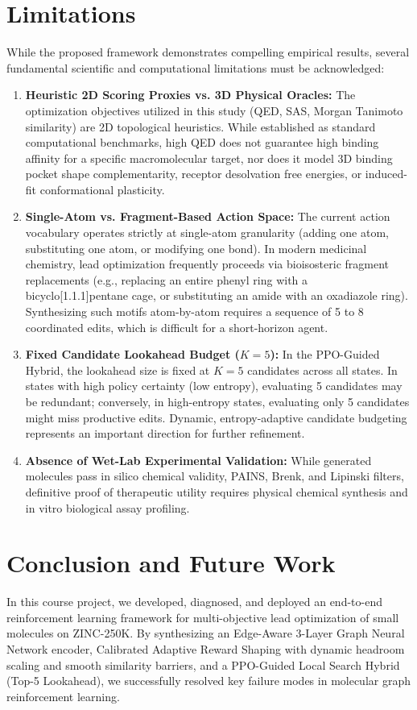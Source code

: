 \documentclass{ieeeaccess}
\begin{document}
\section{Limitations}
\label{sec:limitations}
While the proposed framework demonstrates compelling empirical results, several fundamental scientific and computational limitations must be acknowledged:
\begin{enumerate}
    \item \textbf{Heuristic 2D Scoring Proxies vs. 3D Physical Oracles:} The optimization objectives utilized in this study (QED, SAS, Morgan Tanimoto similarity) are 2D topological heuristics. While established as standard computational benchmarks, high QED does not guarantee high binding affinity for a specific macromolecular target, nor does it model 3D binding pocket shape complementarity, receptor desolvation free energies, or induced-fit conformational plasticity.
    \item \textbf{Single-Atom vs. Fragment-Based Action Space:} The current action vocabulary operates strictly at single-atom granularity (adding one atom, substituting one atom, or modifying one bond). In modern medicinal chemistry, lead optimization frequently proceeds via bioisosteric fragment replacements (e.g., replacing an entire phenyl ring with a bicyclo[1.1.1]pentane cage, or substituting an amide with an oxadiazole ring). Synthesizing such motifs atom-by-atom requires a sequence of 5 to 8 coordinated edits, which is difficult for a short-horizon agent.
    \item \textbf{Fixed Candidate Lookahead Budget ($K=5$):} In the PPO-Guided Hybrid, the lookahead size is fixed at $K=5$ candidates across all states. In states with high policy certainty (low entropy), evaluating 5 candidates may be redundant; conversely, in high-entropy states, evaluating only 5 candidates might miss productive edits. Dynamic, entropy-adaptive candidate budgeting represents an important direction for further refinement.
    \item \textbf{Absence of Wet-Lab Experimental Validation:} While generated molecules pass in silico chemical validity, PAINS, Brenk, and Lipinski filters, definitive proof of therapeutic utility requires physical chemical synthesis and in vitro biological assay profiling.
\end{enumerate}


\section{Conclusion and Future Work}
\label{sec:conclusion}
In this course project, we developed, diagnosed, and deployed an end-to-end reinforcement learning framework for multi-objective lead optimization of small molecules on ZINC-250K. By synthesizing an Edge-Aware 3-Layer Graph Neural Network encoder, Calibrated Adaptive Reward Shaping with dynamic headroom scaling and smooth similarity barriers, and a PPO-Guided Local Search Hybrid (Top-5 Lookahead), we successfully resolved key failure modes in molecular graph reinforcement learning.
\end{document}

